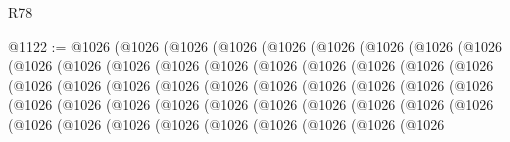 \begin{lexlean}{R78}
\begin{coremodule}
@1122 := @1026
    (@1026
      (@1026
        (@1026
          (@1026
            (@1026
              (@1026
                (@1026
                  (@1026
                    (@1026
                      (@1026
                        (@1026
                          (@1026
                            (@1026
                              (@1026
                                (@1026
                                  (@1026
                                    (@1026
                                      (@1026
                                        (@1026
                                          (@1026
                                            (@1026
                                              (@1026
                                                (@1026
                                                  (@1026
                                                    (@1026
                                                      (@1026
                                                        (@1026
                                                          (@1026
                                                            (@1026
                                                              (@1026
                                                                (@1026
                                                                  (@1026
                                                                    (@1026
                                                                      (@1026
                                                                        (@1026
                                                                          (@1026
                                                                            (@1026
                                                                              (@1026
                                                                                (@1026
                                                                                  (@1026
                                                                                    (@1026
                                                                                      (@1026
                                                                                        (@1026
                                                                                          (@1026
                                                                                            (@1026
                                                                                              (@1026
                                                                                                (@1026

\end{coremodule}
\end{lexlean}
